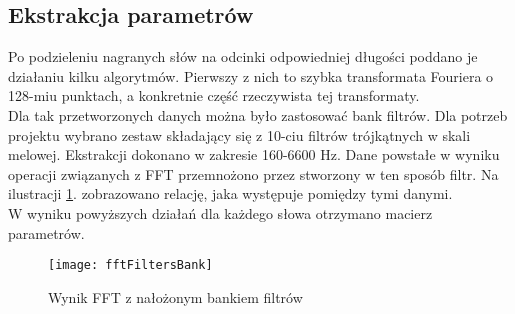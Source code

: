 \subsection{Ekstrakcja parametrów}

Po podzieleniu nagranych słów na odcinki odpowiedniej długości poddano je działaniu kilku algorytmów. Pierwszy z nich to szybka transformata Fouriera o 128-miu punktach, a konkretnie część rzeczywista tej transformaty. \\
Dla tak przetworzonych danych można było zastosować bank filtrów. Dla potrzeb projektu wybrano zestaw składający się z 10-ciu filtrów trójkątnych w skali melowej. Ekstrakcji dokonano w zakresie 160-6600 Hz. Dane powstałe w wyniku operacji związanych z FFT przemnożono przez stworzony w ten sposób filtr. Na ilustracji \ref{rys:fftFiltry}. zobrazowano relację, jaka występuje pomiędzy tymi danymi. \\
W wyniku powyższych działań dla każdego słowa otrzymano macierz parametrów.

\begin{figure}[H]
	\centering
	\texttt{[image: fftFiltersBank]}
	\caption{Wynik FFT z nałożonym bankiem filtrów}
	\label{rys:fftFiltry}
\end{figure}
